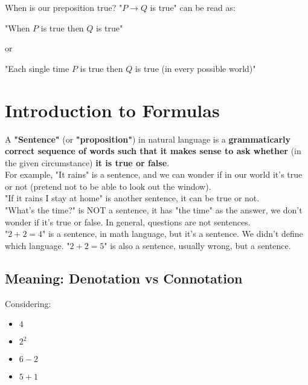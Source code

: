 \documentclass[11pt]{article}
\begin{document}
	When is our preposition true? "$P \rightarrow Q$ is true" can be read as: 
	\begin{center}
		"When $P$ is true then $Q$ is true"
	\end{center}
	 or 
	 \begin{center}
	 	"Each single time $P$ is true then $Q$ is true (in every possible world)"
	 \end{center}
	
	
	\newpage
	
	\section{Introduction to Formulas}
	A \textbf{"Sentence"} (or \textbf{"proposition"}) in natural language is a \textbf{grammaticarly correct sequence of words such that it makes sense to ask whether} (in the given circumstance) \textbf{it is true or false}.\\
	
	For example, "It rains" is a sentence, and we can wonder if in our world it's true or not (pretend not to be able to look out the window).\\
	
	"If it rains I stay at home" is another sentence, it can be true or not.\\
	
	"What's the time?" is NOT a sentence, it has "the time" as the answer, we don't wonder if it's true or false. In general, questions are not sentences.\\
	
	"$2+2 = 4$" is a sentence, in math language, but it's a sentence. We didn't define which language. "$2+2 = 5$" is also a sentence, usually wrong, but a sentence.\\
	
	\newpage
	
	\subsection{Meaning: Denotation vs Connotation}
	Considering: 
	\begin{itemize}
		\item $4$
		\item $2^2$
		\item $6-2$
		\item $5+1$
	\end{itemize}
	
\end{document}

